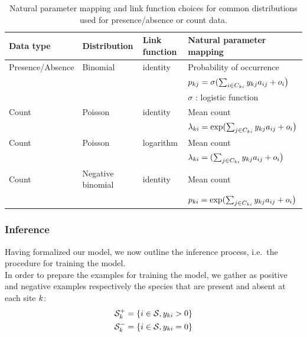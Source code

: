 \documentclass[10pt,a4paper]{article}
\begin{document}
\begin{table}[bthp]
  \centering
  \begin{tabular}{llll}
    \toprule
	Data type & Distribution & Link function & Natural parameter mapping \\ 
    \midrule
	Presence/Absence & Binomial  & identity  & Probability of occurrence \\ 
	 & & & $p_{kj}=\sigma(\sum_{i \in C_{ki}} y_{kj}  a_{ij} + o_i\big)$ \\
	 & & & $\sigma$ : logistic function \\
	 
	 \midrule
	
	Count & Poisson  & identity  &  Mean count \\
	& & & $\lambda_{ki}=\exp(\sum_{j \in C_{ki}} y_{kj}  a_{ij} + o_i\big)$ \\
	
	\midrule
	
	Count & Poisson  & logarithm  &  Mean count \\	
	& & & $\lambda_{ki}=(\sum_{j \in C_{ki}} y_{kj}  a_{ij} + o_i\big)$ \\
	
	\midrule
	
	Count & Negative binomial  & identity  &  Mean count \\
	& & & $p_{ki}=\exp(\sum_{j \in C_{ki}} y_{kj}  a_{ij} + o_i\big)$ \\
	
    
    \bottomrule
\end{tabular}
\caption{Natural parameter mapping and link function choices for common distributions used for presence/absence or count data.}
\label{paramap}
\end{table}

\subsubsection{Inference}
Having formalized our model, we now outline the inference process, i.e.\ the procedure for training the model. \\

In order to prepare the examples for training the model, we gather as positive and negative examples respectively the species that are present and absent at each site $k$:
\begin{align*}
\mathcal{S}_{k}^+ &= \{i \in \mathcal{S}, y_{ki}>0\} \\ 
\mathcal{S}_{k}^- &= \{i \in \mathcal{S}, y_{ki}=0\}
\end{align*}
\end{document}
